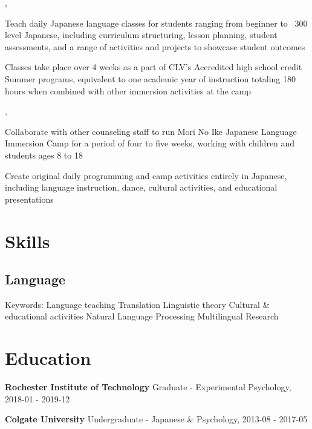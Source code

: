 \documentclass[letterpaper]{deedy-resume_sm}
\begin{document}
, 
\begin{tightitemize}
\item Teach daily Japanese language classes for students ranging from beginner to ~300 level Japanese, including curriculum structuring, lesson planning, student assessments, and a range of activities and projects to showcase student outcomes
\item Classes take place over 4 weeks as a part of CLV's Accredited high school credit Summer programs, equivalent to one academic year of instruction totaling 180 hours when combined with other immersion activities at the camp
\end{tightitemize}
\sectionspace

, 
\begin{tightitemize}
\item Collaborate with other counseling staff to run Mori No Ike Japanese Language Immersion Camp for a period of four to five weeks, working with children and students ages 8 to 18
\item Create original daily programming and camp activities entirely in Japanese, including language instruction, dance, cultural activities, and educational presentations
\end{tightitemize}
\sectionspace

\section{Skills}
\subsection{Language}
Keywords: Language teaching \textbullet{} Translation \textbullet{} Linguistic theory \textbullet{} Cultural \& educational activities \textbullet{} Natural Language Processing \textbullet{} Multilingual Research

\section{Education}
\textbf{Rochester Institute of Technology}
Graduate - Experimental Psychology, 2018-01 - 2019-12

\textbf{Colgate University}
Undergraduate - Japanese \& Psychology, 2013-08 - 2017-05
\end{document}
